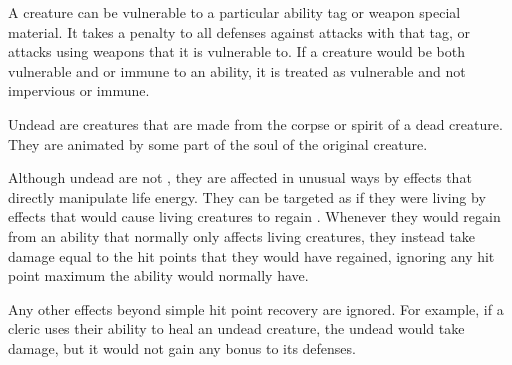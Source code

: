   A creature can be vulnerable to a particular ability tag or weapon special material.
  It takes a  penalty to all defenses against attacks with that tag, or attacks using weapons that it is vulnerable to.
  If a creature would be both vulnerable and \impervious or immune to an ability, it is treated as vulnerable and not impervious or immune.

  Undead are creatures that are made from the corpse or spirit of a dead creature.
  They are animated by some part of the soul of the original creature.

  Although undead are not , they are affected in unusual ways by effects that directly manipulate life energy.
  They can be targeted as if they were living  by \magical effects that would cause living creatures to regain .
  Whenever they would regain  from an ability that normally only affects living creatures, they instead take damage equal to the hit points that they would have regained, ignoring any hit point maximum the ability would normally have.

  Any other effects beyond simple hit point recovery are ignored.
  For example, if a cleric uses their  ability to heal an undead creature, the undead would take damage, but it would not gain any bonus to its defenses.

